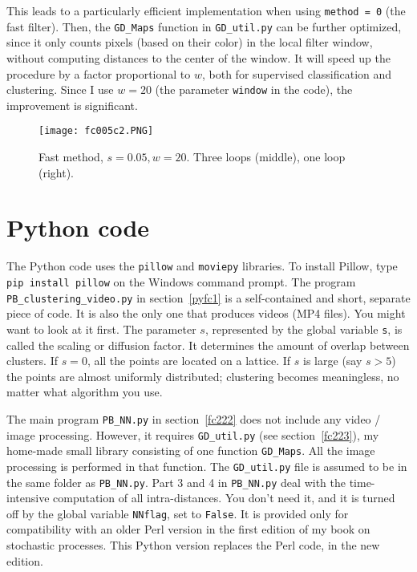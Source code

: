\documentclass[oneside,10pt]{book}
\renewcommand{\arraystretch}{1.4} %
\begin{document}
This leads to a particularly efficient implementation when using \texttt{method = 0} (the fast filter). Then, the \texttt{GD\_Maps} function in \texttt{GD\_util.py} can be further 
optimized, since it only 
counts pixels (based on their color) in the local filter window, without computing distances to the center of the window. It will speed up the procedure
by a factor proportional to $w$, both for supervised classification and clustering. Since I use $w=20$ (the parameter \texttt{window} in the code), the improvement is significant.

\begin{figure}[H]
\centering
\texttt{[image: fc005c2.PNG]}
\caption{Fast method, $s=0.05,w=20$. Three loops (middle), one loop (right).}
\label{fc005c2}
\end{figure}


\renewcommand{\arraystretch}{1.0} %
\renewcommand{\arraystretch}{1.4} %

\section{Python code}\label{pythonviz3}

The Python code uses the \texttt{pillow} and \texttt{moviepy} libraries. To install Pillow, type 
\texttt{pip install pillow} on the Windows command prompt. The program \texttt{PB\_clustering\_video.py} in section~\ref{pyfc1} is a self-contained and short, separate piece of code. It is also the only one that produces videos (MP4 files). 
You might want to look at it first. The parameter $s$, represented by the
global variable \texttt{s}, is called the scaling or diffusion factor. It  determines the amount of overlap between clusters. If $s=0$,
all the points are located on a lattice. If $s$ is large (say $s>5$) the points are almost uniformly distributed; clustering becomes
meaningless, no matter what algorithm you use.

The main program \texttt{PB\_NN.py} in section~\ref{fc222} does not include any video / image processing. However, it requires
\texttt{GD\_util.py} (see section~\ref{fc223}), my home-made small library consisting of one function \texttt{GD\_Maps}. All the image processing is performed in that function. The \texttt{GD\_util.py} file is assumed to be in the same folder as \texttt{PB\_NN.py}. Part 3 and 4 in \texttt{PB\_NN.py} deal with the time-intensive computation of all intra-distances. You don't need it, and it is turned off by the global
variable \texttt{NNflag}, set to \texttt{False}. It is provided only for compatibility with an older Perl version in the first edition of my book on stochastic processes. This Python version replaces the Perl code, in the new edition. 
\end{document}
